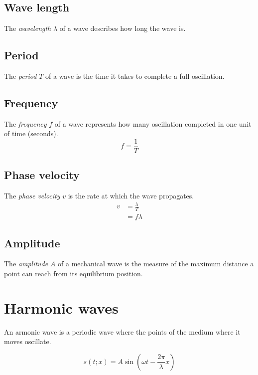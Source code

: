 \documentclass{article}
\begin{document}
\subsection{Wave length}

The \textit{wavelength} \(\lambda\) of a wave describes how long the wave is.

\subsection{Period}

The \textit{period} \(T\) of a wave is the time it takes to complete
a full oscillation.

\subsection{Frequency}

The \textit{frequency} \(f\) of a wave represents how many oscillation
completed in one unit of time (seconds).
\[
    f = \frac{1}{T}
\]

\subsection{Phase velocity}

The \textit{phase velocity} \(v\) is the rate at which
the wave propagates.
\begin{align*}
    v &= \frac{\lambda}{T} \\
    &= f\lambda
\end{align*}

\subsection{Amplitude}

The \textit{amplitude} \(A\) of a mechanical wave is the
measure of the maximum distance a point can reach
from its equilibrium position.

\pagebreak

\section{Harmonic waves}

An armonic wave is a periodic wave where
the points of the medium where it moves oscillate.

\[
    s(t;x) = A \sin
    \left(
        \omega t - \frac{2\pi}{\lambda}x
    \right)
\]
\end{document}
